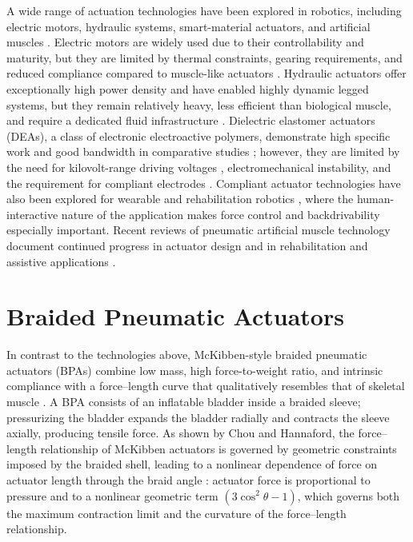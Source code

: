 A wide range of actuation technologies have been explored in robotics, including electric motors, hydraulic systems, smart-material actuators, and artificial muscles \citep{he_mechanism_2020, liang_comparative_2020}. Electric motors are widely used due to their controllability and maturity, but they are limited by thermal constraints, gearing requirements, and reduced compliance compared to muscle-like actuators \citep{veale_towards_2016, suzumori_trends_2018}. Hydraulic actuators offer exceptionally high power density and have enabled highly dynamic legged systems, but they remain relatively heavy, less efficient than biological muscle, and require a dedicated fluid infrastructure \citep{suzumori_trends_2018}. Dielectric elastomer actuators (DEAs), a class of electronic electroactive polymers, demonstrate high specific work and good bandwidth in comparative studies \citep{liang_comparative_2020}; however, they are limited by the need for kilovolt-range driving voltages \citep{madden_artificial_2004}, electromechanical instability, and the requirement for compliant electrodes \citep{liang_comparative_2020}. Compliant actuator technologies have also been explored for wearable and rehabilitation robotics \citep{aksoz_design_2019, leibach_development_2020, li_influence_2020}, where the human-interactive nature of the application makes force control and backdrivability especially important. Recent reviews of pneumatic artificial muscle technology document continued progress in actuator design and in rehabilitation and assistive applications \citep{zhagiparova_recent_2025}.

\section{Braided Pneumatic Actuators}\label{sec:bg_bpa}

In contrast to the technologies above, McKibben-style braided pneumatic actuators (BPAs) combine low mass, high force-to-weight ratio, and intrinsic compliance with a force--length curve that qualitatively resembles that of skeletal muscle \citep{liang_comparative_2020, hunt_modeling_2017}. A BPA consists of an inflatable bladder inside a braided sleeve; pressurizing the bladder expands the bladder radially and contracts the sleeve axially, producing tensile force. As shown by Chou and Hannaford, the force--length relationship of McKibben actuators is governed by geometric constraints imposed by the braided shell, leading to a nonlinear dependence of force on actuator length through the braid angle \citep{chou_measurement_1996}: actuator force is proportional to pressure and to a nonlinear geometric term $(3\cos^2\theta - 1)$, which governs both the maximum contraction limit and the curvature of the force--length relationship.

